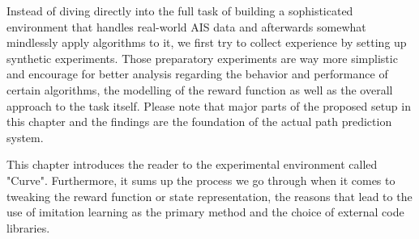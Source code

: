Instead of diving directly into the full task of building a sophisticated environment that handles real-world AIS data and afterwards somewhat mindlessly apply algorithms to it, we first try to collect experience by setting up synthetic experiments. Those preparatory experiments are way more simplistic and encourage for better analysis regarding the behavior and performance of certain algorithms, the modelling of the reward function as well as the overall approach to the task itself. Please note that major parts of the proposed setup in this chapter and the findings are the foundation of the actual path prediction system.
\par
This chapter introduces the reader to the experimental environment called "Curve". Furthermore, it sums up the process we go through when it comes to tweaking the reward function or state representation, the reasons that lead to the use of imitation learning as the primary method and the choice of external code libraries.